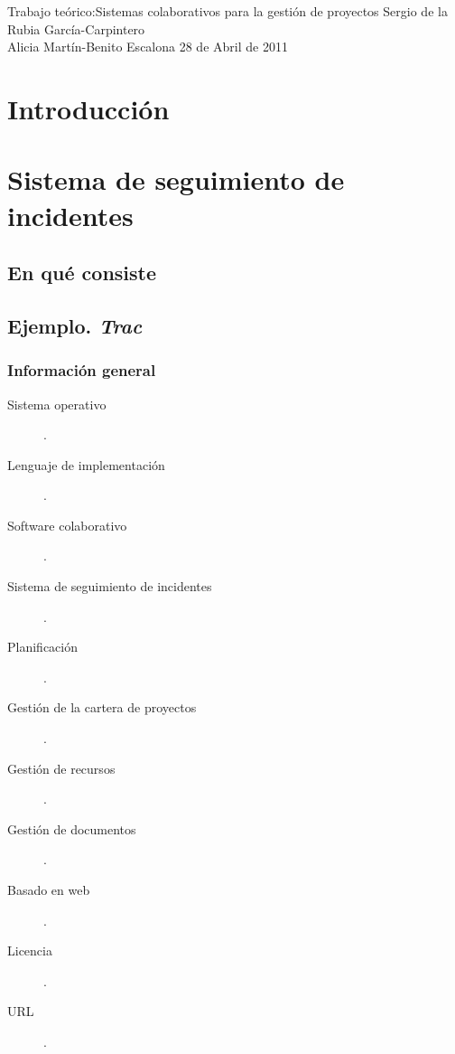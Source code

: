 \documentclass[11pt,a4paper,spanish,twoside]{report}
\begin{document}


{Trabajo teórico:}{Sistemas colaborativos para la gestión de proyectos}
{Sergio de la Rubia García-Carpintero\\Alicia Martín-Benito Escalona}
{28 de Abril de 2011}


\tableofcontents


\chapter{Introducción}

\chapter{Sistema de seguimiento de incidentes}
\section{En qué consiste}
\section{Ejemplo. \emph{Trac}}
  \subsection{Información general}
    \begin{description}
		\item[Sistema operativo]. 
		\item[Lenguaje de implementación].
    \item[Software colaborativo]. 
    \item[Sistema de seguimiento de incidentes]. 
		\item[Planificación].
		\item[Gestión de la cartera de proyectos].
		\item[Gestión de recursos].
		\item[Gestión de documentos].
		\item[Basado en web].
		\item[Licencia].
		\item[URL].
		\end{description}
\end{document}
